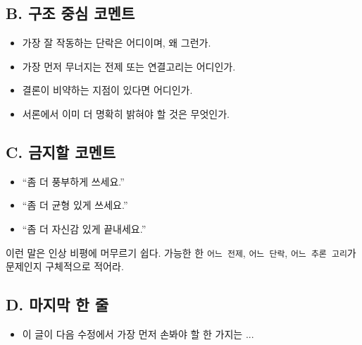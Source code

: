 \subsection{B. 구조 중심 코멘트}\label{b-uxad6cuxc870-uxc911uxc2ec-uxcf54uxba58uxd2b8}

\begin{itemize}
\tightlist
\item
  가장 잘 작동하는 단락은 어디이며, 왜 그런가.
\item
  가장 먼저 무너지는 전제 또는 연결고리는 어디인가.
\item
  결론이 비약하는 지점이 있다면 어디인가.
\item
  서론에서 이미 더 명확히 밝혀야 할 것은 무엇인가.
\end{itemize}

\subsection{C. 금지할 코멘트}\label{c-uxae08uxc9c0uxd560-uxcf54uxba58uxd2b8}

\begin{itemize}
\tightlist
\item
  ``좀 더 풍부하게 쓰세요.''
\item
  ``좀 더 균형 있게 쓰세요.''
\item
  ``좀 더 자신감 있게 끝내세요.''
\end{itemize}

이런 말은 인상 비평에 머무르기 쉽다. 가능한 한 \texttt{어느\ 전제}, \texttt{어느\ 단락}, \texttt{어느\ 추론\ 고리}가 문제인지 구체적으로 적어라.

\subsection{D. 마지막 한 줄}\label{d-uxb9c8uxc9c0uxb9c9-uxd55c-uxc904}

\begin{itemize}
\tightlist
\item
  이 글이 다음 수정에서 가장 먼저 손봐야 할 한 가지는 ...
\end{itemize}
